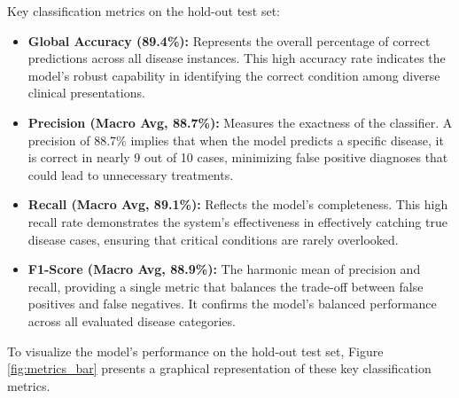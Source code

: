 \documentclass[a4paper,12pt]{report}
\begin{document}
Key classification metrics on the hold-out test set:
\begin{itemize}
    \item \textbf{Global Accuracy (89.4\%):} Represents the overall percentage of correct predictions across all disease instances. This high accuracy rate indicates the model's robust capability in identifying the correct condition among diverse clinical presentations.
    \item \textbf{Precision (Macro Avg, 88.7\%):} Measures the exactness of the classifier. A precision of 88.7\% implies that when the model predicts a specific disease, it is correct in nearly 9 out of 10 cases, minimizing false positive diagnoses that could lead to unnecessary treatments.
    \item \textbf{Recall (Macro Avg, 89.1\%):} Reflects the model's completeness. This high recall rate demonstrates the system's effectiveness in effectively catching true disease cases, ensuring that critical conditions are rarely overlooked.
    \item \textbf{F1-Score (Macro Avg, 88.9\%):} The harmonic mean of precision and recall, providing a single metric that balances the trade-off between false positives and false negatives. It confirms the model's balanced performance across all evaluated disease categories.
\end{itemize}

To visualize the model's performance on the hold-out test set, Figure \ref{fig:metrics_bar} presents a graphical representation of these key classification metrics.
\end{document}
